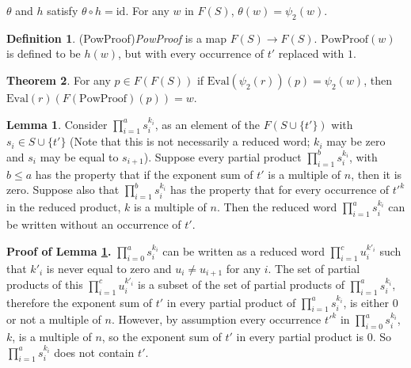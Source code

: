 \documentclass[11pt]{article} %
\theoremstyle{definition}
\newtheorem{theorem}{Theorem}[section]
\theoremstyle{definition}
\theoremstyle{definition}
\theoremstyle{definition}
\newtheorem{sublemma}{Lemma}[theorem]
\theoremstyle{definition}
\newtheorem{defn}[theorem]{Definition}
\theoremstyle{definition}
\begin{document}
$\theta$ and $h$ satisfy $\theta \circ h = \text{id}$. For any $w$ in $F(S)$,
$\theta(w) = \psi_2(w)$.

\begin{defn}(PowProof)\label{PowProof}
  \textit{PowProof} is a map $F(S) \to F(S)$. $\text{PowProof}(w)$ is defined to be
  $h(w)$, but with every occurrence of $t'$ replaced with $1$.
\end{defn}

\begin{theorem}\label{powproof}
  For any $p \in F(F(S))$ if \newline $\text{Eval}(\psi_2(r))(p) = \psi_2(w)$,
  then $\text{Eval}(r)(F(\text{PowProof})(p)) = w$.
\end{theorem}

\begin{sublemma}\label{powproof1}
  Consider $\prod_{i = 1}^a s_i^{k_i}$, as an element of the $F(S \cup \{t'\})$
  with $s_i \in S \cup \{t'\}$ (Note that this is not necessarily a reduced
  word; $k_i$ may be zero and $s_i$ may be equal to $s_{i+1}$).
  Suppose every partial product $\prod_{i=1}^b s_i^{k_i}$,
  with $b \le a$ has the property that if the exponent sum of $t'$ is a multiple
  of $n$, then it is zero. Suppose also that $\prod_{i = 1}^b s_i^{k_i}$ has the
  property that for every occurrence of $t'^k$ in the reduced product, $k$ is a multiple of
  $n$. Then the reduced word $\prod_{i = 1}^a s_i^{k_i}$
  can be written without an occurrence of $t'$.
\end{sublemma}

\textbf{Proof of Lemma \ref{powproof1}.} $\prod_{i=0}^a s_i^{k_i}$ can be written as a reduced
word $\prod_{i = 1}^{c} u_i^{k'_i}$ such that $k'_i$ is never equal to zero and
$u_i \ne u_{i+1}$ for any $i$. The set of partial products of this
$\prod_{i = 1}^{c} u_i^{k'_i}$ is a subset of the set of partial products of $\prod_{i=1}^a s_i^{k_i}$,
therefore the exponent sum of $t'$ in every partial product of $\prod_{i=1}^a s_i^{k_i}$, is
either $0$ or not a multiple of $n$. However, by assumption every occurrence $t'^k$ in
$\prod_{i=0}^a s_i^{k_i}$, $k$, is a multiple of $n$, so the exponent sum of $t'$ in every
partial product is $0$. So $\prod_{i=1}^a s_i^{k_i}$ does not contain $t'$.
\end{document}
